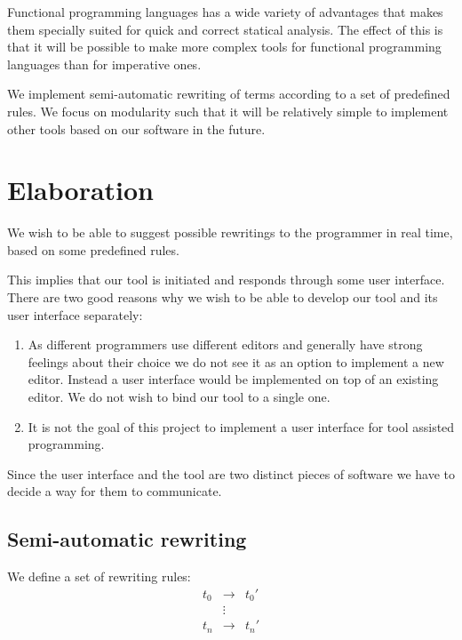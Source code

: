\documentclass[a4paper,oneside]{article}
\begin{document}
Functional programming languages has a wide variety of advantages that makes them specially suited
for quick and correct statical analysis. The effect of this is that it will be possible to make more
complex tools for functional programming languages than for imperative ones.

We implement semi-automatic rewriting of terms according to a set of predefined rules. We focus on
modularity such that it will be relatively simple to implement other tools based on our software in
the future.


\section{Elaboration}
We wish to be able to suggest possible rewritings to the programmer in real time, based on some
predefined rules.

This implies that our tool is initiated and responds through some user interface. There are two good
reasons why we wish to be able to develop our tool and its user interface separately:
\begin{enumerate}
\item As different programmers use different editors and generally have strong feelings
      about their choice we do not see it as an option to implement a new editor. Instead a user
      interface would be implemented on top of an existing editor. We do not wish to bind our
      tool to a single one.
\item It is not the goal of this project to implement a user interface for tool assisted
      programming.
\end{enumerate}

Since the user interface and the tool are two distinct pieces of software we have to decide a way
for them to communicate.

\subsection{Semi-automatic rewriting}
We define a set of rewriting rules:
\begin{eqnarray*}
t_0 &\rightarrow& t_0'\\
&\vdots&\\
t_n &\rightarrow& t_n'
\end{eqnarray*}
\end{document}
